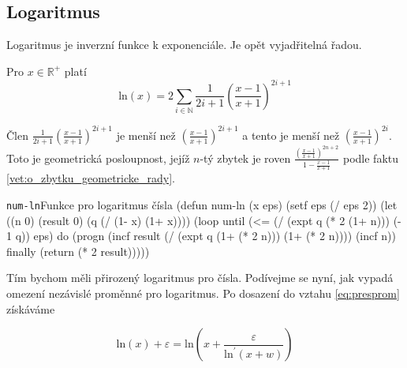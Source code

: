 \subsection{Logaritmus}
Logaritmus je inverzní funkce k exponenciále. Je opět vyjadřitelná řadou.
\begin{fact}
Pro $x\in\mathbb{R}^+$ platí
  \begin{equation}
    \mathrm{ln}(x)=2\sum_{i\in\mathbb{N}}\frac{1}{2i+1}\left(\frac{x-1}{x+1}\right)^{2i+1}
  \end{equation}
\end{fact}

Člen $\frac{1}{2i+1}(\frac{x-1}{x+1})^{2i+1}$ je menší než $(\frac{x-1}{x+1})^{2i+1}$ a  tento je menší než $(\frac{x-1}{x+1})^{2i}$. Toto je geometrická posloupnost, jejíž $n$-tý zbytek je roven $\frac{(\frac{x-1}{x+1})^{2n+2}}{1-\frac{x-1}{x+1}}$ podle faktu \ref{vet:o_zbytku_geometricke_rady}.
\begin{lispcode}{\texttt{num-ln}}{Funkce pro logaritmus čísla}
(\textcolor{funkcionalni}{defun} \textcolor{pojmenovan}{num-ln} (x eps)
  (\textcolor{vedlejsi}{setf} eps (\textcolor{matematicke}{/} eps 2))
  (\textcolor{vedlejsi}{let} ((n 0) (result 0) (q (\textcolor{matematicke}{/} (\textcolor{matematicke}{1-} x) (\textcolor{matematicke}{1+} x))))
    (\textcolor{funkcionalni}{loop} 
      \textcolor{obarvi}{until} (\textcolor{matematicke}{<=} (\textcolor{matematicke}{/} (\textcolor{matematicke}{expt} q (\textcolor{matematicke}{*} 2 (\textcolor{matematicke}{1+} n))) (\textcolor{matematicke}{-} 1 q))
                eps)
      \textcolor{obarvi}{do} (\textcolor{funkcionalni}{progn} 
          (\textcolor{vedlejsi}{incf} result
            (\textcolor{matematicke}{/} (\textcolor{matematicke}{expt} q (\textcolor{matematicke}{1+} (\textcolor{matematicke}{*} 2 n))) (\textcolor{matematicke}{1+} (\textcolor{matematicke}{*} 2 n))))
          (\textcolor{vedlejsi}{incf} n))
      \textcolor{obarvi}{finally} (\textcolor{funkcionalni}{return} (\textcolor{matematicke}{*} 2 result)))))
\end{lispcode}

Tím bychom měli přirozený logaritmus pro čísla. Podívejme se nyní, jak vypadá omezení nezávislé proměnné pro logaritmus. Po dosazení do vztahu \ref{eq:presprom} získáváme

\begin{equation}
\mathrm{ln}(x)+\varepsilon=\mathrm{ln}\left(x+\frac{\varepsilon}{\mathrm{ln}^{'}(x+w)}\right)
\end{equation}

